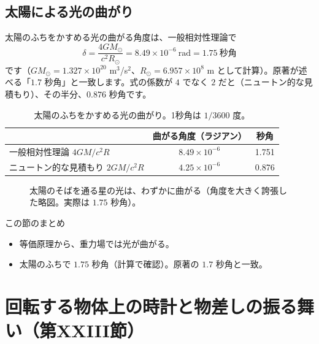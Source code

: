 \documentclass[a4paper,11pt,openany]{ltjsbook}
\begin{document}
\section{太陽による光の曲がり}

太陽のふちをかすめる光の曲がる角度は、一般相対性理論で
\[
\delta=\frac{4GM_\odot}{c^2R_\odot}=8.49\times10^{-6}\ \text{rad}=1.75\ \text{秒角}
\]
です（$GM_\odot=1.327\times10^{20}$ m$^3$/s$^2$、$R_\odot=6.957\times10^{8}$ m として計算）。原著が述べる「$1.7$ 秒角」と一致します。式の係数が $4$ でなく $2$ だと（ニュートン的な見積もり）、その半分、$0.876$ 秒角です。

\begin{table}[htbp]
\centering
\begin{tabular}{lcc}
\toprule
 & 曲がる角度（ラジアン） & 秒角\\
\midrule
一般相対性理論 $4GM/c^2R$ & $8.49\times10^{-6}$ & 1.751\\
ニュートン的な見積もり $2GM/c^2R$ & $4.25\times10^{-6}$ & 0.876\\
\bottomrule
\end{tabular}
\caption{太陽のふちをかすめる光の曲がり。1秒角は $1/3600$ 度。}
\end{table}

\begin{figure}[htbp]
\centering
{}
\caption{太陽のそばを通る星の光は、わずかに曲がる（角度を大きく誇張した略図。実際は $1.75$ 秒角）。}
\end{figure}

\begin{pointbox}{この節のまとめ}
\begin{itemize}[leftmargin=*]
\item 等価原理から、重力場では光が曲がる。
\item 太陽のふちで $1.75$ 秒角（計算で確認）。原著の $1.7$ 秒角と一致。
\end{itemize}
\end{pointbox}

\chapter{回転する物体上の時計と物差しの振る舞い（第XXIII節）}
\end{document}
